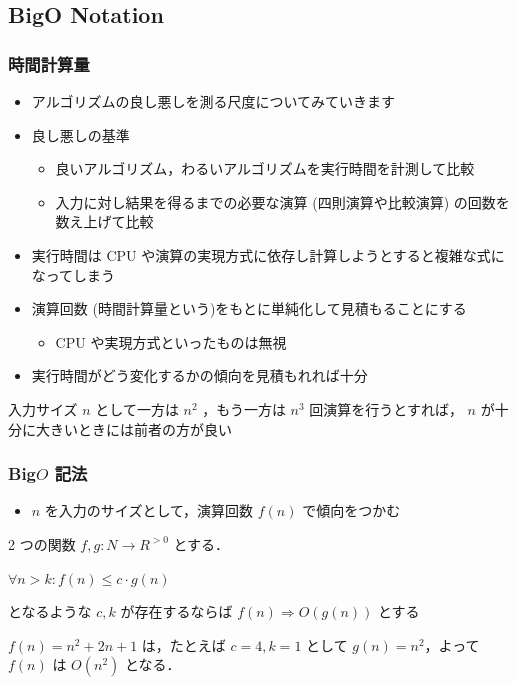\subsection{Big\textendash O Notation}
\begin{frame}[shrink]
\frametitle{時間計算量}
  \begin{itemize}
\item アルゴリズムの良し悪しを測る尺度についてみていきます
\item 良し悪しの基準
    \begin{itemize}
\item 良いアルゴリズム，わるいアルゴリズムを実行時間を計測して比較
\item 入力に対し結果を得るまでの必要な演算 (四則演算や比較演算) の回数を数え上げて比較
    \end{itemize}
\item 実行時間は CPU や演算の実現方式に依存し計算しようとすると複雑な式になってしまう
\item 演算回数 (時間計算量という)をもとに単純化して見積もることにする
    \begin{itemize}
\item CPU や実現方式といったものは無視
    \end{itemize}
\item 実行時間がどう変化するかの傾向を見積もれれば十分
  \end{itemize}
  \begin{example}
入力サイズ $n$ として一方は \(n^2\) ，もう一方は \(n^3\) 回演算を行うとすれば，
 $n$ が十分に大きいときには前者の方が良い
  \end{example}
\end{frame}
\begin{frame}[shrink]
\frametitle{Big\textendash$O$ 記法}
  \begin{itemize}
\item $n$ を入力のサイズとして，演算回数 \(f(n)\) で傾向をつかむ
  \end{itemize}
  \begin{definition}
2 つの関数 \(f, g\colon N\rightarrow R^{>0}\) とする．
    \begin{center}
\(\forall n>k\colon f(n)\leq c\cdot g(n)\)
    \end{center}
となるような \(c, k\) が存在するならば \(f(n)\Rightarrow O(g(n))\) とする
  \end{definition}
  \begin{example}
\(f(n)=n^2+2n+1\) は，たとえば \(c=4, k=1\) として \(g(n)=n^2\)，よって \(f(n)\) は \(O(n^2)\) となる．
  \end{example}
\end{frame}
